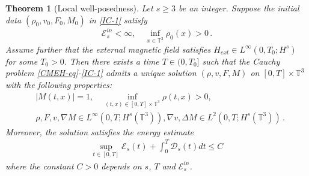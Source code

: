 \documentclass[reqno,11pt]{amsart}
\newtheorem{theorem}{Theorem}[section]
\numberwithin{equation}{section}
\begin{document}
\begin{theorem}[Local well-posedness]\label{Thm1}
    Let $s \geq 3$ be an integer. Suppose the initial data $(\rho_0, v_0, F_0, M_0)$ in \eqref{IC-1} satisfy
    $$ \mathcal{E}_s^{in} < \infty, \quad \inf_{x \in \mathbb{T}^3} \rho_0 (x) > 0 \,. $$
    Assume further that the external magnetic field satisfies $H_{ext} \in L^\infty (0, T_0; H^s)$ for some $T_0 > 0$. Then there exists a time $T \in ( 0, T_0 ]$ such that the Cauchy problem \eqref{CMEH-eq}-\eqref{IC-1} admits a unique solution $(\rho, v, F, M) $ on $[0,T] \times \mathbb{T}^3$ with the following properties:
    \begin{equation*}
        \begin{aligned}
        & |M (t,x)| = 1, \quad \inf_{(t,x) \in [0, T] \times \mathbb{T}^3} \rho(t,x) > 0,  \\
        & \rho, F, v, \nabla M \in L^\infty (0, T; H^s (\mathbb{T}^3)), \nabla v, \Delta M \in L^2 (0, T; H^s (\mathbb{T}^3)) \,.
        \end{aligned}
    \end{equation*}
    Moreover, the solution satisfies the energy estimate
    \begin{equation*}
        \begin{aligned}
            \sup_{t \in [0, T]} \mathcal{E}_s (t) + \int_0^T \mathcal{D}_s (t) d t \leq C
        \end{aligned}
    \end{equation*}
    where the constant $C > 0$ depends on $s$, $T$ and $\mathcal{E}_s^{in}$.
\end{theorem}
\end{document}

